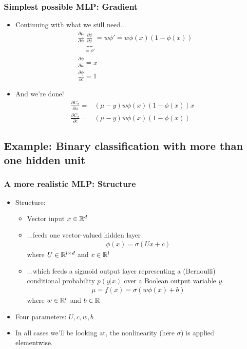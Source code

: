 \documentclass{beamer}
\begin{document}
\begin{frame}
\frametitle{Simplest possible MLP: Gradient}

\begin{itemize}
\item Continuing with what we still need...
\begin{align*}
    &\frac{\partial \underline{\mu}}{\partial \phi}\underbrace{\frac{\partial \phi}{\partial
    \underline{\phi}}}_{=\phi'} = w \phi' = w \phi(x) (1- \phi(x))\\
    &\frac{\partial \underline{\phi}}{\partial u} = x \\
    &\frac{\partial \underline{\phi}}{\partial c} = 1
\end{align*}
\item And we're done!
\begin{align*}
    \frac{\partial C_x}{\partial u} =& (\mu -y) w \phi(x) (1-\phi(x)) x \\
    \frac{\partial C_x}{\partial c} =& (\mu -y) w \phi(x) (1-\phi(x))
\end{align*}
\end{itemize}

\end{frame}


\subsection{Example: Binary classification with more than one hidden unit}


\begin{frame}
\frametitle{A more realistic MLP: Structure}

\begin{itemize}
\item Structure:
	\begin{itemize}
	\item Vector input $x \in \mathbb{R}^d$
	\item ...feeds one vector-valued hidden layer
	\begin{align*}
	    \phi(x) = \sigma(U x + c)
	\end{align*}
	where $U \in \mathbb{R}^{l \times d}$ and $c \in \mathbb{R}^l$
	\item ...which feeds a sigmoid output layer representing a (Bernoulli) conditional probability $p(y|x)$ over a Boolean output variable $y$.
	\begin{align*}
	    \mu = f(x) = \sigma(w \phi(x) +  b)
	\end{align*}
	where $w \in \mathbb{R}^{l}$ and $b \in \mathbb{R}$
	\end{itemize}
\item Four parameters: $U, c, w, b$
\item In all cases we'll be looking at, the nonlinearity (here $\sigma$) is applied elementwise.
\end{itemize}

\end{frame}
\end{document}
